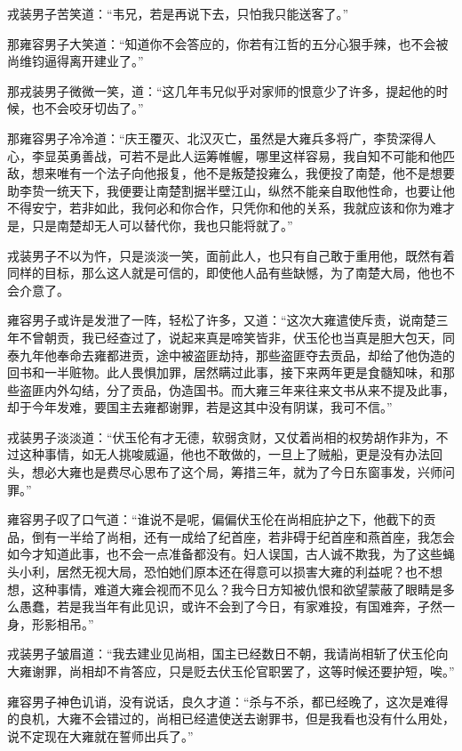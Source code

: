 戎装男子苦笑道：“韦兄，若是再说下去，只怕我只能送客了。”

那雍容男子大笑道：“知道你不会答应的，你若有江哲的五分心狠手辣，也不会被尚维钧逼得离开建业了。”

那戎装男子微微一笑，道：“这几年韦兄似乎对家师的恨意少了许多，提起他的时候，也不会咬牙切齿了。”

那雍容男子冷冷道：“庆王覆灭、北汉灭亡，虽然是大雍兵多将广，李贽深得人心，李显英勇善战，可若不是此人运筹帷幄，哪里这样容易，我自知不可能和他匹敌，想来唯有一个法子向他报复，他不是叛楚投雍么，我便投了南楚，他不是想要助李贽一统天下，我便要让南楚割据半壁江山，纵然不能亲自取他性命，也要让他不得安宁，若非如此，我何必和你合作，只凭你和他的关系，我就应该和你为难才是，只是南楚却无人可以替代你，我也只能将就了。”

戎装男子不以为忤，只是淡淡一笑，面前此人，也只有自己敢于重用他，既然有着同样的目标，那么这人就是可信的，即使他人品有些缺憾，为了南楚大局，他也不会介意了。

雍容男子或许是发泄了一阵，轻松了许多，又道：“这次大雍遣使斥责，说南楚三年不曾朝贡，我已经查过了，说起来真是啼笑皆非，伏玉伦也当真是胆大包天，同泰九年他奉命去雍都进贡，途中被盗匪劫持，那些盗匪夺去贡品，却给了他伪造的回书和一半赃物。此人畏惧加罪，居然瞒过此事，接下来两年更是食髓知味，和那些盗匪内外勾结，分了贡品，伪造国书。而大雍三年来往来文书从来不提及此事，却于今年发难，要国主去雍都谢罪，若是这其中没有阴谋，我可不信。”

戎装男子淡淡道：“伏玉伦有才无德，软弱贪财，又仗着尚相的权势胡作非为，不过这种事情，如无人挑唆威逼，他也不敢做的，一旦上了贼船，更是没有办法回头，想必大雍也是费尽心思布了这个局，筹措三年，就为了今日东窗事发，兴师问罪。”

雍容男子叹了口气道：“谁说不是呢，偏偏伏玉伦在尚相庇护之下，他截下的贡品，倒有一半给了尚相，还有一成给了纪首座，若非碍于纪首座和燕首座，我怎会如今才知道此事，也不会一点准备都没有。妇人误国，古人诚不欺我，为了这些蝇头小利，居然无视大局，恐怕她们原本还在得意可以损害大雍的利益呢？也不想想，这种事情，难道大雍会视而不见么？我今日方知被仇恨和欲望蒙蔽了眼睛是多么愚蠢，若是我当年有此见识，或许不会到了今日，有家难投，有国难奔，孑然一身，形影相吊。”

戎装男子皱眉道：“我去建业见尚相，国主已经数日不朝，我请尚相斩了伏玉伦向大雍谢罪，尚相却不肯答应，只是贬去伏玉伦官职罢了，这等时候还要护短，唉。”

雍容男子神色讥诮，没有说话，良久才道：“杀与不杀，都已经晚了，这次是难得的良机，大雍不会错过的，尚相已经遣使送去谢罪书，但是我看也没有什么用处，说不定现在大雍就在誓师出兵了。”

